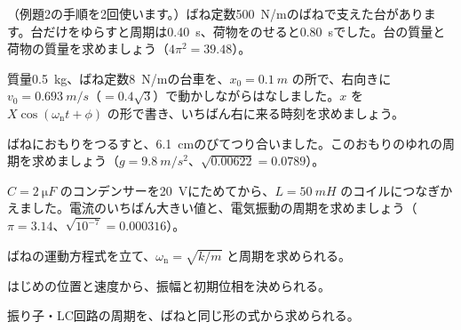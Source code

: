 
\bkproblem （例題2の手順を2回使います。）ばね定数\qty{500}{N/m}のばねで支えた台があります。台だけをゆらすと周期は\qty{0.40}{s}、荷物をのせると\qty{0.80}{s}でした。台の質量と荷物の質量を求めましょう（$4\pi^2=39.48$）。

\bkproblem 質量\qty{0.5}{kg}、ばね定数\qty{8}{N/m}の台車を、$x_0=\qty{0.1}{m}$ の所で、右向きに $v_0=\qty{0.693}{m/s}$（$=0.4\sqrt3$）で動かしながらはなしました。$x$ を $X\cos(\omega_{\mathrm n}t+\phi)$ の形で書き、いちばん右に来る時刻を求めましょう。

\bkproblem ばねにおもりをつるすと、\qty{6.1}{cm}のびてつり合いました。このおもりのゆれの周期を求めましょう（$g=\qty{9.8}{m/s^2}$、$\sqrt{0.00622}=0.0789$）。

\bkproblem $C=\qty{2}{\micro F}$ のコンデンサーを\qty{20}{V}にためてから、$L=\qty{50}{mH}$ のコイルにつなぎかえました。電流のいちばん大きい値と、電気振動の周期を求めましょう（$\pi=3.14$、$\sqrt{10^{-7}}=0.000316$）。

\begin{furikaeri}
\begin{checklist}
\item ばねの運動方程式を立て、$\omega_{\mathrm n}=\sqrt{k/m}$ と周期を求められる。
\item はじめの位置と速度から、振幅と初期位相を決められる。
\item 振り子・LC回路の周期を、ばねと同じ形の式から求められる。
\end{checklist}
\end{furikaeri}

